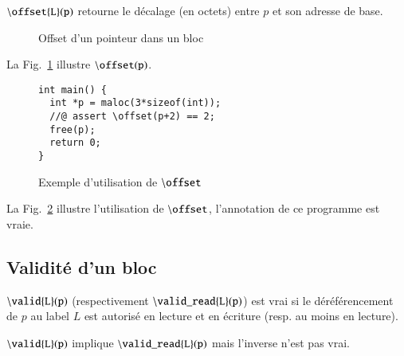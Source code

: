 \documentclass[french]{spimufcphdthesis}
\begin{document}
${\tt \backslash offset\{L\}(p)}$ retourne le décalage (en octets) entre $p$ et
son adresse de base.


\begin{figure}[h]
  \begin{center}
  \end{center}
  \caption{Offset d'un pointeur dans un bloc}
  \label{fig:offset}
\end{figure}

La Fig.~\ref{fig:offset} illustre ${\tt \backslash offset(p)}$.


\begin{figure}[h]
\begin{lstlisting}
int main() {
  int *p = maloc(3*sizeof(int));
  //@ assert \offset(p+2) == 2;
  free(p);
  return 0;
}
\end{lstlisting}
\caption{Exemple d'utilisation de ${\tt \backslash offset}$}
\label{fig:offset-example}
\end{figure}

 La
Fig.~\ref{fig:offset-example} illustre l'utilisation de
${\tt \backslash offset}$, l'annotation de ce programme est vraie.


\subsection{Validité d'un bloc}

${\tt \backslash valid\{L\}(p)}$ (respectivement
${\tt \backslash valid\_read\{L\}(p)}$) est vrai si le déréférencement de $p$
au label $L$ est autorisé en lecture et en écriture (resp. au moins en lecture).

${\tt \backslash valid\{L\}(p)}$ implique ${\tt \backslash valid\_read\{L\}(p)}$
mais l'inverse n'est pas vrai.
\end{document}
